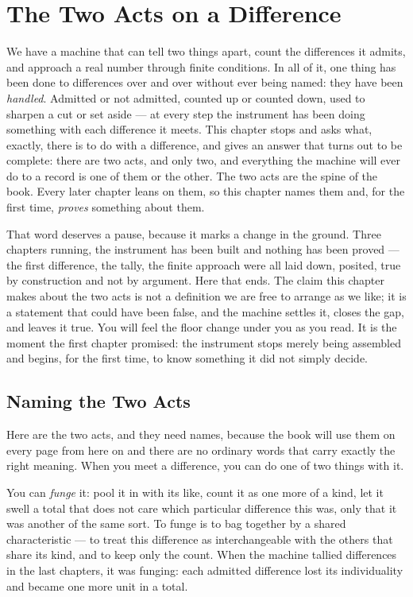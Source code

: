 \chapter{The Two Acts on a Difference}

We have a machine that can tell two things apart, count the differences it admits, and approach a real number
through finite conditions. In all of it, one thing has been done to differences over and over without ever being
named: they have been \emph{handled}. Admitted or not admitted, counted up or counted down, used to sharpen a cut
or set aside --- at every step the instrument has been doing something with each difference it meets. This
chapter stops and asks what, exactly, there is to do with a difference, and gives an answer that turns out to be
complete: there are two acts, and only two, and everything the machine will ever do to a record is one of them or
the other. The two acts are the spine of the book. Every later chapter leans on them, so this chapter names them
and, for the first time, \emph{proves} something about them.

That word deserves a pause, because it marks a change in the ground. Three chapters running, the instrument has
been built and nothing has been proved --- the first difference, the tally, the finite approach were all laid
down, posited, true by construction and not by argument. Here that ends. The claim this chapter makes about the
two acts is not a definition we are free to arrange as we like; it is a statement that could have been false, and
the machine settles it, closes the gap, and leaves it true. You will feel the floor change under you as you read.
It is the moment the first chapter promised: the instrument stops merely being assembled and begins, for the
first time, to know something it did not simply decide.

\section{Naming the Two Acts}

Here are the two acts, and they need names, because the book will use them on every page from here on and there
are no ordinary words that carry exactly the right meaning. When you meet a difference, you can do one of two
things with it.

You can \emph{funge} it: pool it in with its like, count it as one more of a kind, let it swell a total that does
not care which particular difference this was, only that it was another of the same sort. To funge is to bag
together by a shared characteristic --- to treat this difference as interchangeable with the others that share
its kind, and to keep only the count. When the machine tallied differences in the last chapters, it was funging:
each admitted difference lost its individuality and became one more unit in a total.

